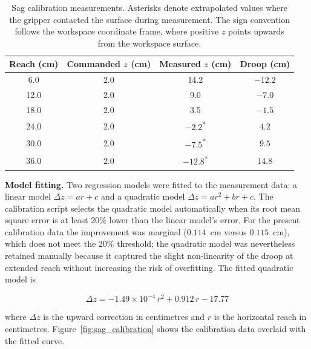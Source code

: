 \begin{table}[H]
    \centering
    \renewcommand{\arraystretch}{1.3}
    \begin{tabular}{|c|c|c|c|}
        \hline
        \textbf{Reach (cm)} & 
        \textbf{Commanded $z$ (cm)} & 
        \textbf{Measured $z$ (cm)} & 
        \textbf{Droop (cm)} \\
        \hline
        6.0  & 2.0 & 14.2 & $-12.2$ \\
        \hline
        12.0 & 2.0 & 9.0  & $-7.0$  \\
        \hline
        18.0 & 2.0 & 3.5  & $-1.5$  \\
        \hline
        24.0 & 2.0 & $-2.2$\textsuperscript{*} & $4.2$ \\
        \hline
        30.0 & 2.0 & $-7.5$\textsuperscript{*} & $9.5$ \\
        \hline
        36.0 & 2.0 & $-12.8$\textsuperscript{*} & $14.8$ \\
        \hline
    \end{tabular}
    \caption{Sag calibration measurements. Asterisks denote 
    extrapolated values where the gripper contacted the surface 
    during measurement. The sign convention follows the workspace 
    coordinate frame, where positive $z$ points upwards from the 
    workspace surface.}
    \label{tab:sag_calibration}
\end{table}

\textbf{Model fitting.} Two regression models were fitted to the
measurement data: a linear model
$\Delta z = a r + c$ and a quadratic model
$\Delta z = a r^2 + b r + c$. The calibration script selects
the quadratic model automatically when its root mean square
error is at least 20\% lower than the linear model's error.
For the present calibration data the improvement was marginal
($0.114$~cm versus $0.115$~cm), which does not meet the 20\%
threshold; the quadratic model was nevertheless retained
manually because it captured the slight non-linearity of the
droop at extended reach without increasing the risk of
overfitting. The fitted quadratic model is

\begin{equation}
    \Delta z = -1.49 \times 10^{-4} \, r^2 + 0.912 \, r - 17.77
\end{equation}

where $\Delta z$ is the upward correction in centimetres and 
$r$ is the horizontal reach in centimetres. Figure~\ref{fig:sag_calibration} shows the 
calibration data overlaid with the fitted curve.


